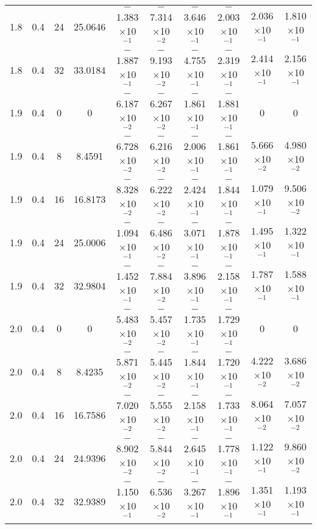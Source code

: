 \documentclass[aps,prd,twocolumn,showpacs,groupedaddress,nofootinbib]{revtex4}
\begin{document}
\begin{widetext}
\begin{table}[h]
\begin{tabular}{|c|c|c|c|c|c|c|c|c|c|}
  1.8&  0.4& 24& 25.0646& $-$1.383$\times$10$^{-1}$& $-$7.314$\times$10$^{-2}$& $-$3.646$\times$10$^{-1}$& $-$2.003$\times$10$^{-1}$&  2.036$\times$10$^{-1}$&    1.810$\times$10$^{-1}$\\
  1.8&  0.4& 32& 33.0184& $-$1.887$\times$10$^{-1}$& $-$9.193$\times$10$^{-2}$& $-$4.755$\times$10$^{-1}$& $-$2.319$\times$10$^{-1}$&  2.414$\times$10$^{-1}$&    2.156$\times$10$^{-1}$\\
  1.9&  0.4&  0&  0& $-$6.187$\times$10$^{-2}$& $-$6.267$\times$10$^{-2}$& $-$1.861$\times$10$^{-1}$& $-$1.881$\times$10$^{-1}$&  0&    0\\
  1.9&  0.4&  8&  8.4591& $-$6.728$\times$10$^{-2}$& $-$6.216$\times$10$^{-2}$& $-$2.006$\times$10$^{-1}$& $-$1.861$\times$10$^{-1}$&  5.666$\times$10$^{-2}$&    4.980$\times$10$^{-2}$\\
  1.9&  0.4& 16& 16.8173& $-$8.328$\times$10$^{-2}$& $-$6.222$\times$10$^{-2}$& $-$2.424$\times$10$^{-1}$& $-$1.844$\times$10$^{-1}$&  1.079$\times$10$^{-1}$&    9.506$\times$10$^{-2}$\\
  1.9&  0.4& 24& 25.0006& $-$1.094$\times$10$^{-1}$& $-$6.486$\times$10$^{-2}$& $-$3.071$\times$10$^{-1}$& $-$1.878$\times$10$^{-1}$&  1.495$\times$10$^{-1}$&    1.322$\times$10$^{-1}$\\
  1.9&  0.4& 32& 32.9804& $-$1.452$\times$10$^{-1}$& $-$7.884$\times$10$^{-2}$& $-$3.896$\times$10$^{-1}$& $-$2.158$\times$10$^{-1}$&  1.787$\times$10$^{-1}$&    1.588$\times$10$^{-1}$\\
  2.0&  0.4&  0&  0& $-$5.483$\times$10$^{-2}$& $-$5.457$\times$10$^{-2}$& $-$1.735$\times$10$^{-1}$& $-$1.729$\times$10$^{-1}$&  0&    0\\
  2.0&  0.4&  8&  8.4235& $-$5.871$\times$10$^{-2}$& $-$5.445$\times$10$^{-2}$& $-$1.844$\times$10$^{-1}$& $-$1.720$\times$10$^{-1}$&  4.222$\times$10$^{-2}$&    3.686$\times$10$^{-2}$\\
  2.0&  0.4& 16& 16.7586& $-$7.020$\times$10$^{-2}$& $-$5.555$\times$10$^{-2}$& $-$2.158$\times$10$^{-1}$& $-$1.733$\times$10$^{-1}$&  8.064$\times$10$^{-2}$&    7.057$\times$10$^{-2}$\\
  2.0&  0.4& 24& 24.9396& $-$8.902$\times$10$^{-2}$& $-$5.844$\times$10$^{-2}$& $-$2.645$\times$10$^{-1}$& $-$1.778$\times$10$^{-1}$&  1.122$\times$10$^{-1}$&    9.860$\times$10$^{-2}$\\
  2.0&  0.4& 32& 32.9389& $-$1.150$\times$10$^{-1}$& $-$6.536$\times$10$^{-2}$& $-$3.267$\times$10$^{-1}$& $-$1.896$\times$10$^{-1}$&  1.351$\times$10$^{-1}$&    1.193$\times$10$^{-1}$\\

\end{tabular}
\end{table}
\end{widetext}
\end{document}
